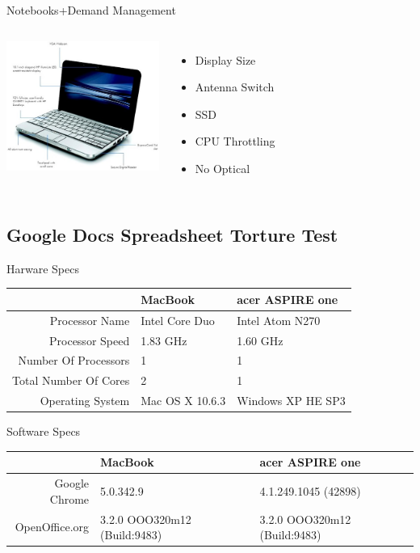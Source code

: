 \documentclass{beamer}
\begin{document}
\begin{frame}{Notebooks+Demand Management}
  \begin{columns}
    \column{5cm}
      \includegraphics[width=5cm]{netbookDiagram.jpg}
    \column{5cm}
    \begin{itemize}
    \item Display Size
    \item Antenna Switch
    \item SSD
    \item CPU Throttling
    \item No Optical
    \end{itemize}
  \end{columns}
\end{frame}

\subsection[GDocs Spreadsheet Testing]{Google Docs Spreadsheet Torture Test}

\begin{frame}{Harware Specs}
  \resizebox{10cm}{!} {
  \begin{tabular}{| r | p{5cm} | p{5cm} |}
    \hline
                          & MacBook          & acer ASPIRE one   \\ \hline
    Processor Name        & Intel Core Duo   & Intel Atom N270   \\ \hline
    Processor Speed       & 1.83 GHz         & 1.60 GHz          \\ \hline
    Number Of Processors  & 1                & 1                 \\ \hline
    Total Number Of Cores & 2                & 1                 \\ \hline
    Operating System      & Mac OS X 10.6.3  & Windows XP HE SP3 \\ \hline
    \hline
  \end{tabular}
}
\end{frame}

\begin{frame}{Software Specs}
  \resizebox{10cm}{!} {
  \begin{tabular}{| r | p{5cm} | p{5cm} |}
    \hline
                                 & MacBook     & acer ASPIRE one \\ \hline
    Google Chrome                & 5.0.342.9                    & 4.1.249.1045 (42898)               \\ \hline
    OpenOffice.org               & 3.2.0 OOO320m12 (Build:9483) & 3.2.0 OOO320m12 (Build:9483)       \\
    \hline
  \end{tabular}
}
\end{frame}
\end{document}
